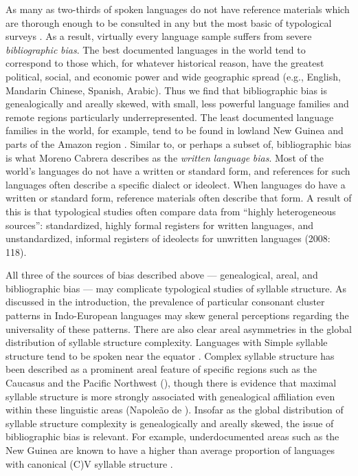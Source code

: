   As many as two-thirds of spoken languages do not have reference materials which are thorough enough to be consulted in any but the most basic of typological surveys \citep[106]{Bakker2011}. As a result, virtually every language sample suffers from severe \textit{bibliographic} \textit{bias}. The best documented languages in the world tend to correspond to those which, for whatever historical reason, have the greatest political, social, and economic power and wide geographic spread (e.g., English, Mandarin Chinese, Spanish, Arabic). Thus we find that bibliographic bias is genealogically and areally skewed, with small, less powerful language families and remote regions particularly underrepresented. The least documented language families in the world, for example, tend to be found in lowland New Guinea and parts of the Amazon region \citep{Hammarström2010}. Similar to, or perhaps a subset of, bibliographic bias is what Moreno Cabrera describes as the \textit{written} \textit{language} \textit{bias}. Most of the world’s languages do not have a written or standard form, and references for such languages often describe a specific dialect or ideolect. When languages do have a written or standard form, reference materials often describe that form. A result of this is that typological studies often compare data from “highly heterogeneous sources”: standardized, highly formal registers for written languages, and unstandardized, informal registers of ideolects for unwritten languages (2008: 118).

  All three of the sources of bias described above — genealogical, areal, and bibliographic bias — may complicate typological studies of syllable structure. As discussed in the introduction, the prevalence of particular consonant cluster patterns in Indo-European languages may skew general perceptions regarding the universality of these patterns. There are also clear areal asymmetries in the global distribution of syllable structure complexity. Languages with Simple syllable structure tend to be spoken near the equator \citep{Maddieson2013a}. Complex syllable structure has been described as a prominent areal feature of specific regions such as the Caucasus \citep{Chirikba2008} and the Pacific Northwest (\citealt{ThompsonKinkade1990}), though there is evidence that maximal syllable structure is more strongly associated with genealogical affiliation even within these linguistic areas (Napoleão de \citealt{Souza2017}). Insofar as the global distribution of syllable structure complexity is genealogically and areally skewed, the issue of bibliographic bias is relevant. For example, underdocumented areas such as the New Guinea are known to have a higher than average proportion of languages with canonical (C)V syllable structure \citep{Maddieson2013a}.

